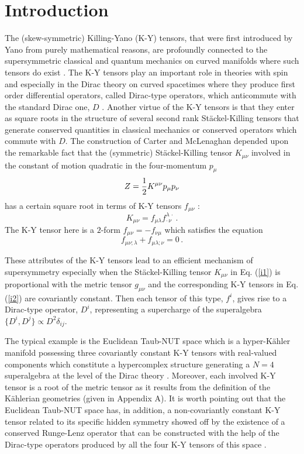 \documentclass[a4paper,12pt]{article}
\begin{document}
\section{Introduction}

The (skew-symmetric) Killing-Yano (K-Y) tensors, that were first introduced 
by Yano \cite{Y} from purely mathematical reasons, are profoundly connected 
to the supersymmetric classical and quantum mechanics on curved manifolds 
where such tensors do exist \cite{GRH}.  The K-Y tensors play an important 
role in theories with spin and especially in the Dirac theory on curved 
spacetimes where they produce first order differential operators, called 
Dirac-type operators, which anticommute with the standard Dirac one, $D$  
\cite{CML}. Another virtue of the K-Y tensors is that they enter as square 
roots in the structure of several second rank St\" ackel-Killing tensors that 
generate conserved quantities in classical mechanics or conserved operators 
which commute with $D$. 
The construction of Carter and McLenaghan 
depended upon the remarkable fact that the (symmetric) St\" ackel-Killing 
tensor $K_{\mu\nu}$ involved in the constant of motion quadratic in the 
four-momentum $p_\mu$ 
\begin{equation}\label{i1}
Z = {1\over 2} K^{\mu\nu} p_\mu p_\nu
\end{equation}
has a certain square root in terms of K-Y tensors $f_{\mu\nu}$ 
\cite{PF}:
\begin{equation}\label{i2}
K_{\mu\nu} = f_{\mu\lambda} f^{\lambda\,\cdot} _{\cdot\,\nu}\,. 
\end{equation}
\noindent The K-Y tensor here is a $2$-form $f_{\mu\nu} = - f_{\nu\mu}$ 
which satisfies the equation
\begin{equation}\label{i3}
f_{\mu\nu;\lambda}+f_{\mu\lambda;\nu} = 0\,.
\end{equation}

These  attributes of the K-Y tensors lead to an 
efficient mechanism of supersymmetry especially when the 
St\" ackel-Killing tensor $K_{\mu\nu}$ in Eq. (\ref{i1}) is proportional 
with the metric tensor $g_{\mu\nu}$ and the corresponding K-Y tensors 
in Eq. (\ref{i2}) are covariantly constant. Then each tensor of this type, 
$f^i$, gives rise to a Dirac-type operator,  $D^i$,  representing a 
supercharge of the superalgebra $\{ D^i , D^j \} \propto D^2 \delta_{ij} $.

The typical example is the Euclidean Taub-NUT space which is a 
hyper-K\" ahler manifold 
possessing three covariantly constant K-Y tensors with real-valued components 
which constitute a hypercomplex structure generating a $N=4$ superalgebra at 
the level of the Dirac theory \cite{CV0}. Moreover, each involved K-Y tensor 
is a root of the metric tensor as it results from the definition of the 
K\" ahlerian geometries (given in Appendix A). It is worth 
pointing out that the Euclidean Taub-NUT space has, in addition, a 
non-covariantly 
constant K-Y tensor related to its specific hidden symmetry showed off 
by the existence of a conserved Runge-Lenz operator that can be constructed 
with the help of the Dirac-type operators produced by all the four K-Y tensors 
of this space \cite{CV}.   
\end{document}
